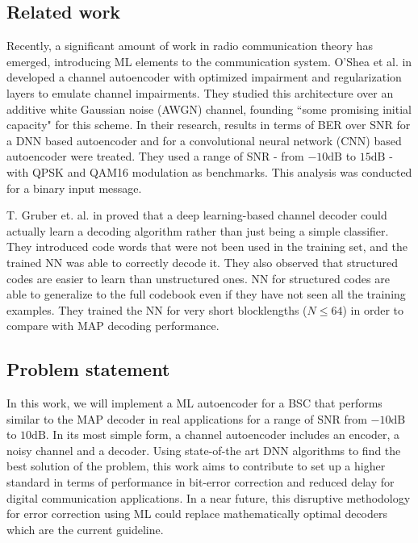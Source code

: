 \documentclass[conference]{IEEEtran}
\begin{document}
\subsection{Related work}

Recently, a significant amount of work in radio communication theory has emerged, introducing ML elements to the communication system. O'Shea et al. in \cite{osheaautoencoder} developed a channel autoencoder with optimized impairment and regularization layers to emulate channel impairments. They studied this architecture over an additive white Gaussian noise (AWGN) channel, founding ``some promising initial capacity" for this scheme. In their research, results in terms of BER over SNR for a DNN based autoencoder and for a convolutional neural network (CNN) based autoencoder were treated. They used a range of SNR - from $-10 \text{dB}$ to $15 \text{dB}$ - with QPSK and QAM16 modulation as benchmarks. This analysis was conducted for a binary input message.

    
T. Gruber et. al. in \cite{2018} proved that a deep learning-based channel decoder could actually learn a decoding algorithm rather than just being a simple classifier. They introduced code words that were not been used in the training set, and the trained NN was able to correctly decode it. They also observed that structured codes are easier to learn than unstructured ones. NN for structured codes are able to generalize to the full codebook even if they have not seen all the training examples. They trained the NN for very short blocklengths ($N \leq 64$) in order to compare with MAP decoding performance.

\subsection{Problem statement}

In this work, we will implement a ML autoencoder for a  BSC that performs similar to the MAP decoder in real applications for a range of SNR from $-10 \text{dB}$ to $10 \text{dB}$. In its most simple form, a channel autoencoder includes an encoder, a noisy channel and a decoder. Using state-of-the art DNN algorithms to find the best solution of the problem, this work aims to contribute to set up a higher standard in terms of performance in bit-error correction and reduced delay for digital communication applications. In a near future, this disruptive methodology for error correction using ML could replace mathematically optimal decoders which are the current guideline.
\end{document}
